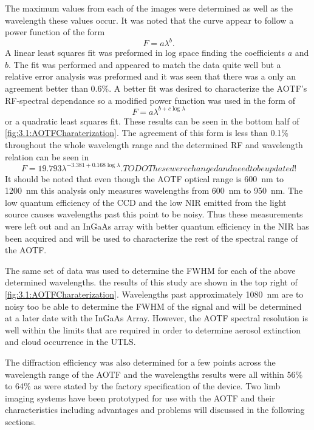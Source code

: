 The maximum values from each of the images were determined as well as the wavelength these values occur. It was noted that the curve appear to follow a power function of the form
\begin{equation}
    \ F = a\lambda^{b}.
    \label{eqn:3.1:powerFunction}
\end{equation}
A linear least squares fit was preformed in log space finding the coefficients $a$ and $b$. The fit was performed and appeared to match the data quite well but a relative error analysis was preformed and it was seen that there was a only an agreement better than 0.6\%. A better fit was desired to characterize the AOTF's RF-spectral dependance so a modified power function was used in the form of
 \begin{equation}
    \ F = a\lambda^{b+c\log\lambda}
    \label{eqn:3.1:modifiedPowerFunction}
\end{equation}
or a quadratic least squares fit. These results can be seen in the bottom half of \autoref{fig:3.1:AOTFCharaterization}. The agreement of this form is less than 0.1\% throughout the whole wavelength range and the determined RF and wavelength relation can be seen in
\begin{equation}
    \ F = 19.793\lambda^{-3.381+0.168\log\lambda}. TODO These were changed and need to be updated!
    \label{eqn:3.1:modifiedPowerFunctionCoeffiecicents}
\end{equation}
It should be noted that even though the AOTF optical range is 600~nm to 1200~nm this analysis only measures wavelengths from 600~nm to 950~nm. The low quantum efficiency of the CCD and the low NIR emitted from the light source causes wavelengths past this point to be noisy. Thus these measurements were left out and an InGaAs array with better quantum efficiency in the NIR has been acquired and will be used to characterize the rest of the spectral range of the AOTF.

The same set of data was used to determine the FWHM for each of the above determined wavelengths. the results of this study are shown in the top right of \autoref{fig:3.1:AOTFCharaterization}. Wavelengths past approximately 1080~nm are to noisy too be able to determine the FWHM of the signal and will be determined at a later date with the InGaAs Array. However, the AOTF spectral resolution is well within the limits that are required in order to determine aerosol extinction and cloud occurrence in the UTLS.

The diffraction efficiency was also determined for a few points across the wavelength range of the AOTF and the wavelengths results were all within 56$\%$ to 64$\%$ as were stated by the factory specification of the device. Two limb imaging systems have been prototyped for use with the AOTF and their characteristics including advantages and problems will discussed in the following sections. 